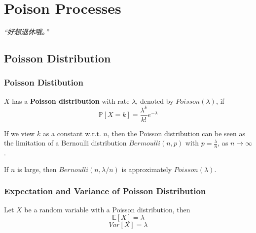 \chapter{Poison Processes}
\emph{“好想退休哦。”}
\newpage

\section{Poisson Distribution}
    \subsection{Poisson Distibution}
    \begin{definition}
        $X$ has a \textbf{Poisson distribution} with rate $\lambda$, denoted by $Poisson(\lambda)$, if
        \[ \mathbb{P}[X=k] = \frac{\lambda^k}{k!}e^{-\lambda} \]
    \end{definition}
    \begin{remark}
        If we view $k$ as a constant w.r.t. $n$, then the Poisson distribution can be seen as the limitation of a Bernoulli distribution $Bermoulli(n, p)$ with $p = \frac{\lambda}{n}$, as $n\to\infty$.
    \end{remark}
    \begin{theorem}
        If $n$ is large, then $Bernoulli(n, \lambda/n)$ is approximately $Poisson(\lambda)$.
    \end{theorem}

    \subsection{Expectation and Variance of Poisson Distribution}
    Let $X$ be a random variable with a Poisson distribution, then
    \[ \mathbb{E}[X] = \lambda \]
    \[ Var[X] = \lambda \]

